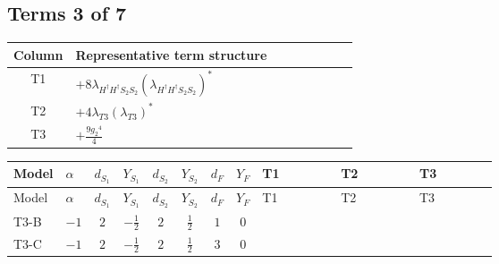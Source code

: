 \documentclass[8pt]{article}
\begin{document}
\begin{landscape}
\subsection*{Terms 3 of 7}
\begin{center}
\begin{tabular}{@{}c >{\raggedright\arraybackslash}p{0.82\linewidth}@{}}
\toprule
Column & Representative term structure \\
\midrule
T1 & \(\displaystyle +8 {\lambda_{H^\dagger H^\dagger S_2 S_2}} \left({\lambda_{H^\dagger H^\dagger S_2 S_2}}\right)^{*}\) \\
\midrule
T2 & \(\displaystyle +4 {\lambda_{T3}} \left({\lambda_{T3}}\right)^{*}\) \\
\midrule
T3 & \(\displaystyle +\frac{9 {g_2}^4}{4}\) \\
\midrule
\bottomrule
\end{tabular}
\end{center}
\smallskip
\tiny
\begin{longtable}{@{}llcccccc >{\raggedright\arraybackslash}p{0.21\linewidth} >{\raggedright\arraybackslash}p{0.21\linewidth} >{\raggedright\arraybackslash}p{0.21\linewidth}@{}}
\toprule
Model & $\alpha$ & $d_{S_1}$ & $Y_{S_1}$ & $d_{S_2}$ & $Y_{S_2}$ & $d_F$ & $Y_F$ & T1 & T2 & T3 \\
\midrule
\endfirsthead
\toprule
Model & $\alpha$ & $d_{S_1}$ & $Y_{S_1}$ & $d_{S_2}$ & $Y_{S_2}$ & $d_F$ & $Y_F$ & T1 & T2 & T3 \\
\midrule
\endhead
T3-B & $-1$ & $2$ & $-\frac{1}{2}$ & $2$ & $\frac{1}{2}$ & $1$ & $0$ & \scriptsize\adjustbox{max width=\linewidth}{$\begin{gathered} +8 {\lambda_{H^\dagger H^\dagger S_2 S_2}} \left({\lambda_{H^\dagger H^\dagger S_2 S_2}}\right)^{*}\end{gathered}$} & \scriptsize\adjustbox{max width=\linewidth}{$\begin{gathered} +4 {\lambda_{T3}} \left({\lambda_{T3}}\right)^{*}\end{gathered}$} & \scriptsize\adjustbox{max width=\linewidth}{$\begin{gathered} +\frac{9 {g_2}^4}{4}\end{gathered}$} \\
\midrule
T3-C & $-1$ & $2$ & $-\frac{1}{2}$ & $2$ & $\frac{1}{2}$ & $3$ & $0$ & \scriptsize\adjustbox{max width=\linewidth}{$\begin{gathered} +8 {\lambda_{H^\dagger H^\dagger S_2 S_2}} \left({\lambda_{H^\dagger H^\dagger S_2 S_2}}\right)^{*}\end{gathered}$} & \scriptsize\adjustbox{max width=\linewidth}{$\begin{gathered} +4 {\lambda_{T3}} \left({\lambda_{T3}}\right)^{*}\end{gathered}$} & \scriptsize\adjustbox{max width=\linewidth}{$\begin{gathered} +\frac{9 {g_2}^4}{4}\end{gathered}$} \\

\end{longtable}
\end{landscape}
\end{document}
